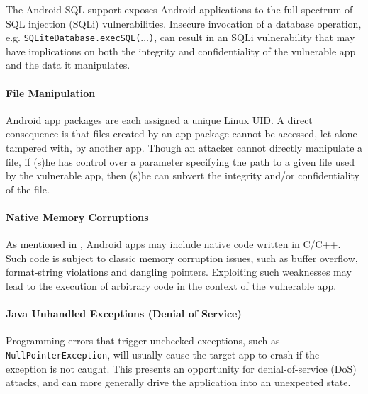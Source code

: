 The Android SQL
support exposes Android applications to the full spectrum of SQL injection (SQLi) vulnerabilities.
Insecure invocation of a database operation, e.g. \texttt{SQLiteDatabase.execSQL($\ldots$)}, can result in an SQLi vulnerability that may have
implications on both the integrity and confidentiality of the vulnerable
app and the data it manipulates.

\paragraph{File Manipulation} Android
app packages are each assigned a unique Linux UID. A direct consequence
is that files created by an app package cannot be accessed,
let alone tampered with, by another app. Though an attacker cannot directly manipulate a file, if (s)he has control over a parameter specifying the path to a given
 file used by the vulnerable app, then (s)he can subvert
the integrity and/or confidentiality of the file.

\paragraph{Native Memory Corruptions} As mentioned in , Android apps may include
native code written in C/C++. Such code is subject
to classic memory corruption issues, such as buffer overflow, 
format-string violations and dangling pointers. Exploiting such weaknesses may lead to the execution of arbitrary
code in the context of the vulnerable app.


\paragraph{Java Unhandled Exceptions (Denial of Service)} Programming errors that trigger unchecked exceptions, such as \texttt{NullPointerException},
will usually cause the target app to crash if the exception
is not caught. This presents an opportunity for denial-of-service (DoS) attacks, and can more generally drive the application into an unexpected state.